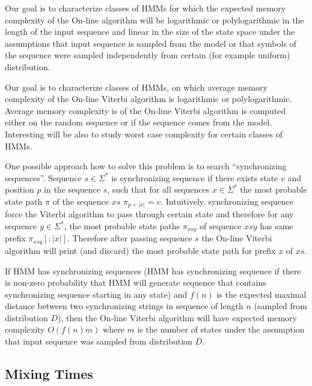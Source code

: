 Our goal is to characterize classes of HMMs for which  the expected memory
complexity of the On-line algorithm will be logarithmic or polylogarithmic in
the length of the input sequence and linear in the size of the state space
under the assumptions that input sequence is sampled from the model or that
symbols of the sequence were sampled independently from certain (for example
uniform) distribution.


Our goal is to characterize classes of HMMs, on which average memory complexity
of the On-line Viterbi algorithm is logarithmic or polylogarithmic. Average
memory complexity is of the On-line Viterbi algorithm is computed either on the
random sequence or if the sequence comes from the model. Interesting will be
also to study worst case complexity for certain classes of HMMs.

One possible approach how to solve this problem is to search ``synchronizing
sequences''. Sequence $s\in\Sigma^*$ is synchronizing sequence if there exists
state $v$ and position $p$ in the sequence $s$, such that for all sequences
$x\in \Sigma^*$ the most probable state path $\pi$ of the sequence $xs$
$\pi_{p+|x|}=v$. Intuitively, synchronizing sequence force the Viterbi algorithm
to pass through certain state and therefore for any sequence $y\in \Sigma^*$,
the most probable state paths $\pi_{xsy}$ of sequence $xsy$ has same prefix
$\pi_{xsy}[:|x|]$. Therefore after passing sequence $s$ the On-line Viterbi
algorithm will print (and discard) the most probable state path for prefix $x$
of $xs$. 

If HMM has synchronizing sequences (HMM has synchronizing sequence if there is
non-zero probability that HMM will generate sequence that contains synchronizing
sequence starting in any state) and $f(n)$ is the expected maximal distance
between two synchronizing strings in sequence of length $n$ (sampled from
distribution $D$), then the On-line Viterbi algorithm will have expected memory
complexity $O(f(n)m)$ where $m$ is the number of states under the assumption
that input sequence was sampled from distribution $D$.


\subsection{Mixing Times}

